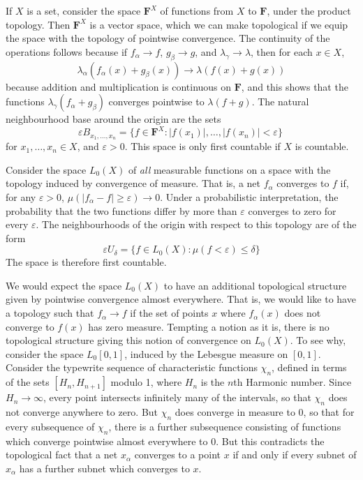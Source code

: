 \begin{example}
    If $X$ is a set, consider the space $\mathbf{F}^X$ of functions from $X$ to $\mathbf{F}$, under the product topology. Then $\mathbf{F}^X$ is a vector space, which we can make topological if we equip the space with the topology of pointwise convergence. The continuity of the operations follows because if $f_\alpha \to f$, $g_\beta \to g$, and $\lambda_\gamma \to \lambda$, then for each $x \in X$,
    \[ \lambda_\alpha (f_\alpha(x) + g_\beta(x)) \to \lambda( f(x) + g(x)) \]
    because addition and multiplication is continuous on $\mathbf{F}$, and this shows that the functions $\lambda_\gamma (f_\alpha + g_\beta)$ converges pointwise to $\lambda(f + g)$. The natural neighbourhood base around the origin are the sets
    \[ \varepsilon B_{x_1, \dots, x_n} = \{ f \in \mathbf{F}^X : |f(x_1)|, \dots, |f(x_n)| < \varepsilon \}\ \]
    for $x_1, \dots, x_n \in X$, and $\varepsilon > 0$. This space is only first countable if $X$ is countable.
\end{example}

\begin{example}
    Consider the space $L_0(X)$ of {\it all} measurable functions on a space with the topology induced by convergence of measure. That is, a net $f_\alpha$ converges to $f$ if, for any $\varepsilon > 0$, $\mu ( |f_\alpha - f| \geq \varepsilon ) \to 0$. Under a probabilistic interpretation, the probability that the two functions differ by more than $\varepsilon$ converges to zero for every $\varepsilon$. The neighbourhoods of the origin with respect to this topology are of the form
    \[ \varepsilon U_\delta = \{ f \in L_0(X): \mu(f < \varepsilon) \leq \delta \} \]
    The space is therefore first countable.
\end{example}

\begin{example}
    We would expect the space $L_0(X)$ to have an additional topological structure given by pointwise convergence almost everywhere. That is, we would like to have a topology such that $f_\alpha \to f$ if the set of points $x$ where $f_\alpha(x)$ does not converge to $f(x)$ has zero measure. Tempting a notion as it is, there is no topological structure giving this notion of convergence on $L_0(X)$. To see why, consider the space $L_0[0,1]$, induced by the Lebesgue measure on $[0,1]$. Consider the typewrite sequence of characteristic functions $\chi_n$, defined in terms of the sets $[H_n, H_{n+1}]$ modulo 1, where $H_n$ is the $n$th Harmonic number. Since $H_n \to \infty$, every point intersects infinitely many of the intervals, so that $\chi_n$ does not converge anywhere to zero. But $\chi_n$ does converge in measure to 0, so that for every subsequence of $\chi_n$, there is a further subsequence consisting of functions which converge pointwise almost everywhere to 0. But this contradicts the topological fact that a net $x_\alpha$ converges to a point $x$ if and only if every subnet of $x_\alpha$ has a further subnet which converges to $x$.
\end{example}

